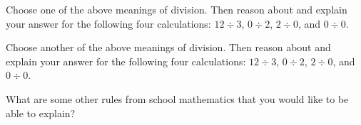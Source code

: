\documentclass{ximera}
\begin{document}
%
%
%
%
%
%
%
%
%

\begin{problem}
Choose one of the above meanings of division.  Then reason about and explain your answer for the following four calculations: $12\div 3$, $0\div 2$, $2\div 0$, and $0\div 0$.  
\begin{freeResponse}
\end{freeResponse}
\vspace{2.5in}

\end{problem}

\newpage
\begin{problem}
Choose another of the above meanings of division.  Then reason about and explain your answer for the following four calculations:  $12\div 3$, $0\div 2$, $2\div 0$, and $0\div 0$.  
\begin{freeResponse}
\end{freeResponse}
\vspace{2.5in}

\end{problem}


\begin{problem}
What are some other rules from school mathematics that you would like
to be able to explain?
\begin{freeResponse}
\end{freeResponse}
\vspace{2.5in}

\end{problem}
\end{document}
